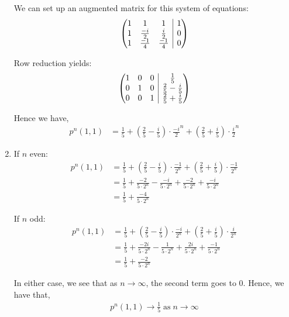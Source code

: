 \documentclass[12pt]{article}
\makeatletter
\newenvironment{amatrix}[1]{%
  \left(\begin{array}{@{}*{#1}{c}|c@{}}
}{%
  \end{array}\right)
}
\makeatother
\begin{document}
\begin{enumerate}[label=(\Alph*)]
We can set up an augmented matrix for this system of equations:
\begin{align*}
\begin{amatrix}{3}
1 & 1 & 1 & 1\\
1 & \frac{-i}{2} & \frac{i}{2} & 0\\
1 & \frac{-1}{4} & \frac{-1}{4} & 0
\end{amatrix}
\end{align*}

Row reduction yields:
\begin{align*}
\begin{amatrix}{3}
1 & 0 & 0 & \frac{1}{5}\\
0 & 1 & 0 & \frac{2}{5} - \frac{i}{5}\\
0 & 0 & 1 & \frac{2}{5} + \frac{i}{5}
\end{amatrix}
\end{align*}

Hence we have,
\begin{align*}
p^n(1, 1) &= \frac{1}{5} + \left(\frac{2}{5} - \frac{i}{5}\right) \cdot \frac{-i}{2}^n + \left(\frac{2}{5} + \frac{i}{5}\right) \cdot \frac{i}{2}^n
\end{align*}

\item If $n$ even:
\begin{align*}
p^n(1, 1) &= \frac{1}{5} + \left(\frac{2}{5} - \frac{i}{5}\right) \cdot \frac{-1}{2^n} + \left(\frac{2}{5} + \frac{i}{5}\right) \cdot \frac{-1}{2^n}\\
&= \frac{1}{5} + \frac{-2}{5 \cdot 2^n} - \frac{-i}{5 \cdot 2^n} + \frac{-2}{5 \cdot 2^n} + \frac{-i}{5 \cdot 2^n}\\
&= \frac{1}{5} + \frac{-4}{5 \cdot 2^n}
\end{align*}

If $n$ odd:
\begin{align*}
p^n(1, 1) &= \frac{1}{5} + \left(\frac{2}{5} - \frac{i}{5}\right) \cdot \frac{-i}{2^n} + \left(\frac{2}{5} + \frac{i}{5}\right) \cdot \frac{i}{2^n}\\
&= \frac{1}{5} + \frac{-2i}{5 \cdot 2^n} - \frac{1}{5 \cdot 2^n} + \frac{2i}{5 \cdot 2^n} + \frac{-1}{5 \cdot 2^n}\\
&= \frac{1}{5} + \frac{-2}{5 \cdot 2^n}
\end{align*}

In either case, we see that as $n \to \infty$, the second term goes to $0$. Hence, we have that,
\begin{align*}
p^n(1, 1) \to \frac{1}{5} \; \text{as} \; n \to \infty
\end{align*}

\end{enumerate}
\end{document}

